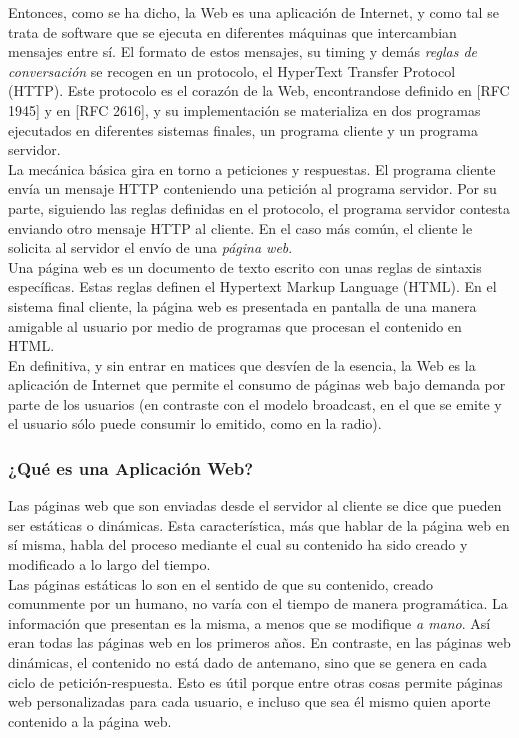 \documentclass[a4paper]{report}
\begin{document}
    Entonces, como se ha dicho, la Web es una aplicación de Internet, y como tal se trata de software que se ejecuta en diferentes máquinas que intercambian mensajes entre sí. El formato de estos mensajes, su timing y demás \emph{reglas de conversación} se recogen en un protocolo, el HyperText Transfer Protocol (HTTP). Este protocolo es el corazón de la Web, encontrandose definido en [RFC 1945] y en [RFC 2616], y su implementación se materializa en dos programas ejecutados en diferentes sistemas finales, un programa cliente y un programa servidor.
    \\
    
    La mecánica básica gira en torno a peticiones y respuestas. El programa cliente envía un mensaje HTTP conteniendo una petición al programa servidor. Por su parte, siguiendo las reglas definidas en el protocolo, el programa servidor contesta enviando otro mensaje HTTP al cliente. En el caso más común, el cliente le solicita al servidor el envío de una \emph{página web}.
    \\
    
    Una página web es un documento de texto escrito con unas reglas de sintaxis específicas. Estas reglas definen el Hypertext Markup Language (HTML). En el sistema final cliente, la página web es presentada en pantalla de una manera amigable al usuario por medio de programas que procesan el contenido en HTML.
    \\
    
    En definitiva, y sin entrar en matices que desvíen de la esencia, la Web es la aplicación de Internet que permite el consumo de páginas web bajo demanda por parte de los usuarios (en contraste con el modelo broadcast, en el que se emite y el usuario sólo puede consumir lo emitido, como en la radio).
    
    \subsubsection{¿Qué es una Aplicación Web?}
    Las páginas web que son enviadas desde el servidor al cliente se dice que pueden ser estáticas o dinámicas. Esta característica, más que hablar de la página web en sí misma, habla del proceso mediante el cual su contenido ha sido creado y modificado a lo largo del tiempo.
    \\
    
    Las páginas estáticas lo son en el sentido de que su contenido, creado comunmente por un humano, no varía con el tiempo de manera programática. La información que presentan es la misma, a menos que se modifique \emph{a mano}. Así eran todas las páginas web en los primeros años. En contraste, en las páginas web dinámicas, el contenido no está dado de antemano, sino que se genera en cada ciclo de petición-respuesta. Esto es útil porque entre otras cosas permite páginas web personalizadas para cada usuario, e incluso que sea él mismo quien aporte contenido a la página web.
    \\
    
\end{document}
